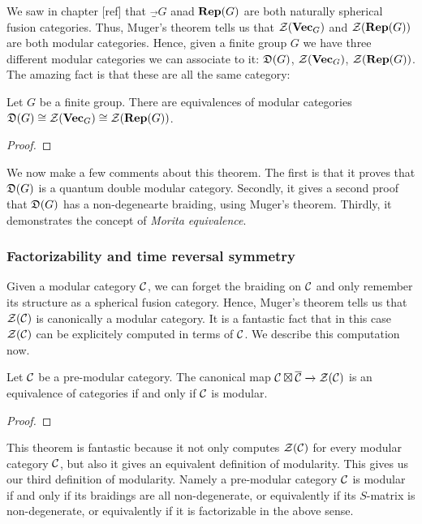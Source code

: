 We saw in chapter [ref] that $\Vec_G$ anad ${\bf Rep}(G)$ are both naturally spherical fusion categories. Thus, Muger's theorem tells us that ${\mathcal Z}({\bf Vec}_G)$ and ${\mathcal Z}({\bf Rep}(G))$ are both modular categories. Hence, given a finite group $G$ we have three different modular categories we can associate to it: ${\mathfrak D}(G)$, ${\mathcal Z}({\bf Vec}_G)$, ${\mathcal Z}({\bf Rep}(G))$. The amazing fact is that these are all the same category:

\begin{prop} Let $G$ be a finite group. There are equivalences of modular categories ${\mathfrak D}(G)\cong {\mathcal Z}({\bf Vec}_G)\cong {\mathcal Z}({\bf Rep}(G))$.
\end{prop}
\begin{proof}
\end{proof}

We now make a few comments about this theorem. The first is that it proves that ${\mathfrak D}(G)$ is a quantum double modular category. Secondly, it gives a second proof that ${\mathfrak D}(G)$ has a non-degenearte braiding, using Muger's theorem. Thirdly, it demonstrates the concept of {\em Morita equivalence}.


\subsubsection{Factorizability and time reversal symmetry}

Given a modular category ${\mathcal C}$, we can forget the braiding on ${\mathcal C}$ and only remember its structure as a spherical fusion category. Hence, Muger's theorem tells us that ${\mathcal Z}({\mathcal C})$ is canonically a modular category. It is a fantastic fact that in this case ${\mathcal Z}({\mathcal C})$ can be explicitely computed in terms of ${\mathcal C}$. We describe this computation now.


\begin{prop} Let ${\mathcal C}$ be a pre-modular category. The canonical map ${\mathcal C}\boxtimes \overline{{\mathcal C}}\xrightarrow{}{\mathcal Z}({\mathcal C})$ is an equivalence of categories if and only if ${\mathcal C}$ is modular.
\end{prop}
\begin{proof}
\end{proof}

This theorem is fantastic because it not only computes ${\mathcal Z}({\mathcal C})$ for every modular category ${\mathcal C}$, but also it gives an equivalent definition of modularity. This gives us our third definition of modularity. Namely a pre-modular category ${\mathcal C}$ is modular if and only if its braidings are all non-degenerate, or equivalently if its $S$-matrix is non-degenerate, or equivalently if it is factorizable in the above sense.

